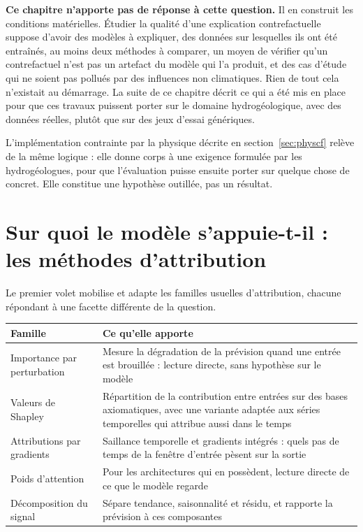 \textbf{Ce chapitre n'apporte pas de réponse à cette question.} Il en construit les conditions
matérielles. Étudier la qualité d'une explication contrefactuelle suppose d'avoir des modèles à
expliquer, des données sur lesquelles ils ont été entraînés, au moins deux méthodes à comparer,
un moyen de vérifier qu'un contrefactuel n'est pas un artefact du modèle qui l'a produit, et des
cas d'étude qui ne soient pas pollués par des influences non climatiques. Rien de tout cela
n'existait au démarrage. La suite de ce chapitre décrit ce qui a été mis en place pour que ces
travaux puissent porter sur le domaine hydrogéologique, avec des données réelles, plutôt que sur
des jeux d'essai génériques.

L'implémentation contrainte par la physique décrite en section~\ref{sec:physcf} relève de la
même logique : elle donne corps à une exigence formulée par les hydrogéologues, pour que
l'évaluation puisse ensuite porter sur quelque chose de concret. Elle constitue une hypothèse
outillée, pas un résultat.

\section{Sur quoi le modèle s'appuie-t-il : les méthodes d'attribution}

Le premier volet mobilise et adapte les familles usuelles d'attribution, chacune répondant à une
facette différente de la question.

\begin{center}
\begin{tabularx}{\textwidth}{@{}lX@{}}
\toprule
\textbf{Famille} & \textbf{Ce qu'elle apporte} \\
\midrule
Importance par perturbation & Mesure la dégradation de la prévision quand une entrée est
brouillée : lecture directe, sans hypothèse sur le modèle \\
Valeurs de Shapley~\cite{lundberg2017shap} & Répartition de la contribution entre entrées sur
des bases axiomatiques, avec une variante adaptée aux séries temporelles qui attribue aussi dans
le temps~\cite{bento2021timeshap} \\
Attributions par gradients~\cite{sundararajan2017ig,captum} & Saillance temporelle et gradients
intégrés : quels pas de temps de la fenêtre d'entrée pèsent sur la sortie \\
Poids d'attention & Pour les architectures qui en possèdent, lecture directe de ce que le modèle
regarde \\
Décomposition du signal & Sépare tendance, saisonnalité et résidu, et rapporte la prévision à
ces composantes \\
\bottomrule
\end{tabularx}
\end{center}

